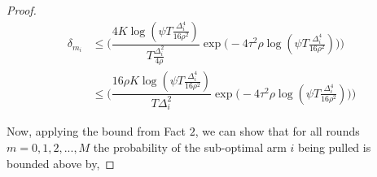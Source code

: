 \begin{proof}
\begin{align*}
\delta_{m_{i}}& \leq \bigg(\dfrac{4K\log (\psi T \frac{\Delta_{i}^{4}}{16\rho^{2}})}{T\frac{\Delta_{i}^{2}}{4\rho}}\exp\big(-4\tau^{2}\rho\log (\psi T\frac{\Delta_{i}^{4}}{16\rho^{2}})\big)\bigg)\\
&\leq \bigg(\dfrac{16\rho K\log (\psi T \frac{\Delta_{i}^{4}}{16\rho^{2}})}{T\Delta_{i}^{2}}\exp\big(-4\tau^{2}\rho\log (\psi T\frac{\Delta_{i}^{4}}{16\rho^{2}})\big)\bigg)
\end{align*}

%

Now, applying the bound from Fact $2$, we can show that for all rounds $m=0,1,2,...,M$ the probability of the sub-optimal arm $i$ being pulled is bounded above by,


\end{proof}
